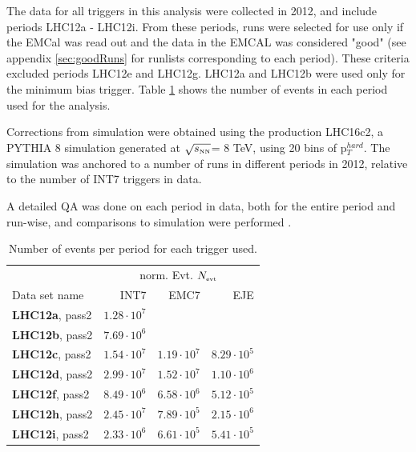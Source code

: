 \documentclass[ALICE]{ALICE_analysis_notes}
\newcommand{\sNN}{$\sqrt{s_{\mbox{\tiny NN}}}$\xspace}
\begin{document}
The data for all triggers in this analysis were collected in 2012, and include periods LHC12a - LHC12i. From these periods, runs were selected for use only if the EMCal was read out and the data in the EMCAL was considered "good" (see appendix \ref{sec:goodRuns} for runlists corresponding to each period). These criteria excluded periods LHC12e and LHC12g. LHC12a and LHC12b were used only for the minimum bias trigger. Table \ref{table:eventsPerPeriod} shows the number of events in each period used for the analysis.

Corrections from simulation were obtained using the production LHC16c2, a PYTHIA 8 simulation generated at \sNN = 8 TeV, using 20 bins of p$_T^{hard}$. The simulation was anchored to a number of runs in different periods in 2012, relative to the number of INT7 triggers in data.

A detailed QA was done on each period in data, both for the entire period and run-wise, and comparisons to simulation were performed \cite{JIRATicket}.

\begin{table}[h!]
    \centering
    \footnotesize
    \setlength\tabcolsep{5pt}
    \begin{tabular}{l rr r} \toprule
        &\multicolumn{3}{c}{norm. Evt. $N_{\mbox{\tiny evt}}$} \\
        Data set name &   INT7 & EMC7 & EJE \\ \midrule
        \textbf{LHC12a}, pass2 & $1.28 \cdot 10^7$ \\ 
        \textbf{LHC12b}, pass2 & $7.69 \cdot 10^6$ \\ 
        \textbf{LHC12c}, pass2 & $1.54 \cdot 10^7$ & $1.19 \cdot 10^7$ & $8.29 \cdot 10^5$ \\ 
        \textbf{LHC12d}, pass2 & $2.99 \cdot 10^7$ & $1.52 \cdot 10^7$ & $1.10 \cdot 10^6$ \\ 
        \textbf{LHC12f}, pass2 & $8.49 \cdot 10^6$ & $6.58 \cdot 10^6$ & $5.12 \cdot 10^5$ \\
        \textbf{LHC12h}, pass2 & $2.45 \cdot 10^7$ & $7.89 \cdot 10^5$ & $2.15 \cdot 10^6$ \\
        \textbf{LHC12i}, pass2 & $2.33 \cdot 10^6$ & $6.61 \cdot 10^5$ & $5.41 \cdot 10^5$ \\
        \bottomrule
    \end{tabular}
    \caption{Number of events per period for each trigger used.}
    \label{table:eventsPerPeriod}
\end{table}
\end{document}
